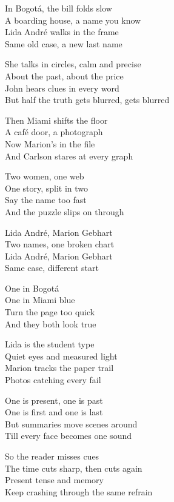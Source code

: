 \begin{lyrics}
In Bogotá, the bill folds slow\\
A boarding house, a name you know\\
Lida André walks in the frame\\
Same old case, a new last name

She talks in circles, calm and precise\\
About the past, about the price\\
John hears clues in every word\\
But half the truth gets blurred, gets blurred

Then Miami shifts the floor\\
A café door, a photograph\\
Now Marion’s in the file\\
And Carlson stares at every graph

Two women, one web\\
One story, split in two\\
Say the name too fast\\
And the puzzle slips on through

Lida André, Marion Gebhart\\
Two names, one broken chart\\
Lida André, Marion Gebhart\\
Same case, different start

One in Bogotá\\
One in Miami blue\\
Turn the page too quick\\
And they both look true

Lida is the student type\\
Quiet eyes and measured light\\
Marion tracks the paper trail\\
Photos catching every fail

One is present, one is past\\
One is first and one is last\\
But summaries move scenes around\\
Till every face becomes one sound

So the reader misses cues\\
The time cuts sharp, then cuts again\\
Present tense and memory\\
Keep crashing through the same refrain


\end{lyrics}
